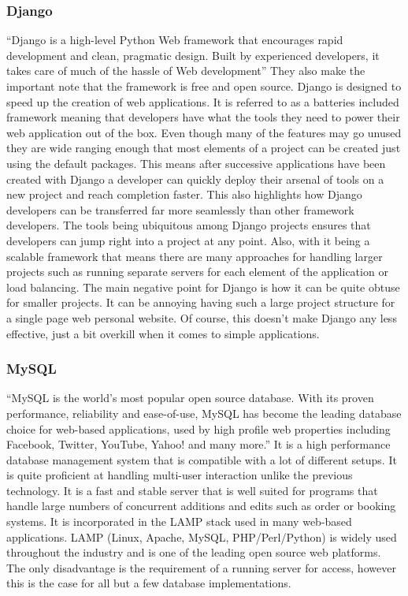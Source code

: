 \documentclass[12pt]{article}
\begin{document}
        \subsubsection{Django}
“Django is a high-level Python Web framework that encourages rapid development and clean, pragmatic design. Built by experienced developers, it takes care of much of the hassle of Web development”\cite{technologyDjangoQuote} They also make the important note that the framework is free and open source. \bigbreak 
\noindent
Django is designed to speed up the creation of web applications. It is referred to as a batteries included framework meaning that developers have what the tools they need to power their web application out of the box. Even though many of the features may go unused they are wide ranging enough that most elements of a project can be created just using the default packages. This means after successive applications have been created with Django a developer can quickly deploy their arsenal of tools on a new project and reach completion faster.\bigbreak 
\noindent
This also highlights how Django developers can be transferred far more seamlessly than other framework developers. The tools being ubiquitous among Django projects ensures that developers can jump right into a project at any point. Also, with it being a scalable framework that means there are many approaches for handling larger projects such as running separate servers for each element of the application or load balancing.\bigbreak 
\noindent
The main negative point for Django is how it can be quite obtuse for smaller projects. It can be annoying having such a large project structure for a single page web personal website. Of course, this doesn’t make Django any less effective, just a bit overkill when it comes to simple applications.

        \subsubsection{MySQL}
“MySQL is the world's most popular open source database. With its proven performance, reliability and ease-of-use, MySQL has become the leading database choice for web-based applications, used by high profile web properties including Facebook, Twitter, YouTube, Yahoo! and many more.”\cite{technologyMySQLQuote} It is a high performance database management system that is compatible with a lot of different setups.\bigbreak 
\noindent
It is quite proficient at handling multi-user interaction unlike the previous technology. It is a fast and stable server that is well suited for programs that handle large numbers of concurrent additions and edits such as order or booking systems.\bigbreak 
\noindent
It is incorporated in the LAMP stack used in many web-based applications. LAMP (Linux, Apache, MySQL, PHP/Perl/Python) is widely used throughout the industry and is one of the leading open source web platforms.\bigbreak 
\noindent
The only disadvantage is the requirement of a running server for access, however this is the case for all but a few database implementations.
\end{document}
